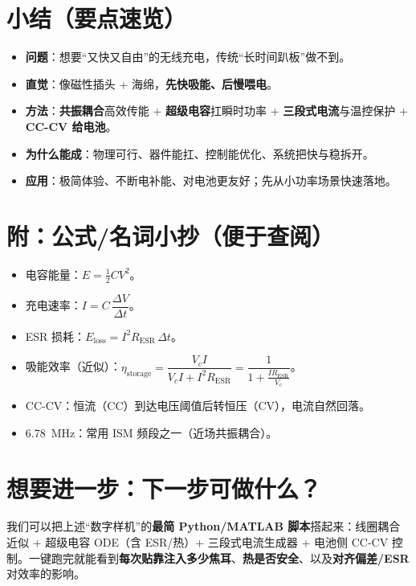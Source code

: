 \documentclass[11pt]{ctexart}
\begin{document}
\section*{小结（要点速览）}
\begin{itemize}
  \item \textbf{问题}：想要“又快又自由”的无线充电，传统“长时间趴板”做不到。
  \item \textbf{直觉}：像磁性插头 + 海绵，\textbf{先快吸能、后慢喂电}。
  \item \textbf{方法}：\textbf{共振耦合}高效传能 + \textbf{超级电容}扛瞬时功率 + \textbf{三段式电流}与温控保护 + \textbf{CC-CV 给电池}。
  \item \textbf{为什么能成}：物理可行、器件能扛、控制能优化、系统把快与稳拆开。
  \item \textbf{应用}：极简体验、不断电补能、对电池更友好；先从小功率场景快速落地。
\end{itemize}

\section*{附：公式/名词小抄（便于查阅）}
\begin{itemize}
  \item 电容能量：$E=\tfrac{1}{2} C V^2$。
  \item 充电速率：$I=C\,\dfrac{\Delta V}{\Delta t}$。
  \item ESR 损耗：$E_{\text{loss}}=I^2 R_{\text{ESR}} \, \Delta t$。
  \item 吸能效率（近似）：$\eta_{\text{storage}}=\dfrac{V_c I}{V_c I + I^2 R_{\text{ESR}}}=\dfrac{1}{1+\tfrac{I R_{\text{ESR}}}{V_c}}$。
  \item CC-CV：恒流（CC）到达电压阈值后转恒压（CV），电流自然回落。
  \item 6.78~MHz：常用 ISM 频段之一（近场共振耦合）。
\end{itemize}

\section*{想要进一步：下一步可做什么？}
我们可以把上述“数字样机”的\textbf{最简 Python/MATLAB 脚本}搭起来：线圈耦合近似 + 超级电容 ODE（含 ESR/热）+ 三段式电流生成器 + 电池侧 CC-CV 控制。一键跑完就能看到\textbf{每次贴靠注入多少焦耳}、\textbf{热是否安全}、以及\textbf{对齐偏差/ESR}对效率的影响。
\end{document}
